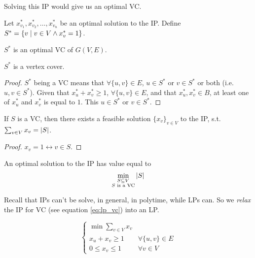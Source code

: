     Solving this IP would give us an optimal VC.

    Let $x_{v_1}^*, x_{v_2}^*, \dots, x_{v_n}^*$ be an optimal solution to the IP. Define $S^* = \{ v \; \vert \; v \in V \wedge x_v^* = 1 \}$.

    \begin{theorem}
        $S^*$ is an optimal VC of $G(V,E)$.
    \end{theorem}

    \begin{lemma}
        $S^*$ is a vertex cover.
    \end{lemma}

    \begin{proof}
        $S^*$ being a VC means that $\forall \{u,v\} \in E$, $u \in S^*$ or $v \in S^*$ or both (i.e. $u,v \in S^*$).
        Given that $x_u^* + x_v^* \geq 1$, $\forall \{ u,v \} \in E$, and that $x_u^*, x_v^* \in B$, at least one of $x_u^*$ and $x_v^*$ is equal to $1$.
        This $u \in S^*$ or $v \in S^*$.
    \end{proof}

    \begin{lemma}
        If $S$ is a VC, then there exists a feasible solution $\{ x_v \}_{v \in V}$ to the IP, s.t. $\sum_{v \in V} x_v = \vert S \vert$.
    \end{lemma}

    \begin{proof}
        $x_v = 1 \leftrightarrow v \in S$.
    \end{proof}

    \begin{corollary}
        An optimal solution to the IP has value equal to
        \[ \min_{\substack{S \subseteq V\\ S \text{ is a VC}}} \vert S \vert \]
    \end{corollary}

    Recall that IPs can't be solve, in general, in polytime, while LPs can.
    So we \textit{relax} the IP for VC (see equation \ref{eq:lp_vc}) into an LP.
    
    \begin{equation}\label{eq:ip_vc}
        \begin{cases}
            \min \sum_{v \in V} x_v\\
            x_u + x_v \geq 1    & \forall \{ u,v \} \in E\\
            0 \leq x_v \leq 1   & \forall v \in V
        \end{cases}
    \end{equation}

